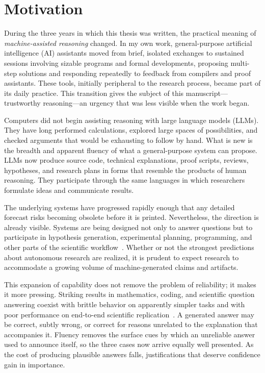 \section{Motivation}
\label{sec:intro-motivation}

During the three years in which this thesis was written, the practical meaning
of \emph{machine-assisted reasoning} changed. In my own work, general-purpose
artificial intelligence (AI) assistants moved from brief, isolated exchanges
to sustained sessions involving sizable programs and formal developments,
proposing multi-step solutions and responding repeatedly to feedback from
compilers and proof assistants. These tools, initially peripheral to the
research process, became part of its daily practice. This transition gives the
subject of this manuscript---trustworthy reasoning---an urgency that was less
visible when the work began.

Computers did not begin assisting reasoning with large language models (LLMs).
They have long performed calculations, explored large spaces of possibilities,
and checked arguments that would be exhausting to follow by hand. What is new
is the breadth and apparent fluency of what a general-purpose system can
propose. LLMs now produce source code, technical explanations, proof scripts,
reviews, hypotheses, and research plans in forms that resemble the products of
human reasoning. They participate through the same languages in which
researchers formulate ideas and communicate results.

The underlying systems have progressed rapidly enough that any detailed
forecast risks becoming obsolete before it is printed. Nevertheless, the
direction is already visible.
Systems are being designed not only to answer questions but to participate in
hypothesis generation, experimental planning, programming, and other parts of
the scientific workflow~\cite{stanfordAIIndex2026,gottweis2026coscientist}.
Whether or not the strongest predictions about autonomous research are
realized, it is prudent to expect research to accommodate a growing volume of
machine-generated claims and artifacts.

This expansion of capability does not remove the problem of reliability; it
makes it more pressing. Striking results in mathematics, coding, and scientific
question answering coexist with brittle behavior on apparently simpler tasks
and with poor performance on end-to-end scientific
replication~\cite{stanfordAIIndex2026}. A generated answer may be correct,
subtly wrong, or correct for reasons unrelated to the explanation that
accompanies it. Fluency removes the surface cues by which an unreliable answer
used to announce itself, so the three cases now arrive equally well presented.
As the cost of producing plausible answers falls, justifications that deserve
confidence gain in importance.

